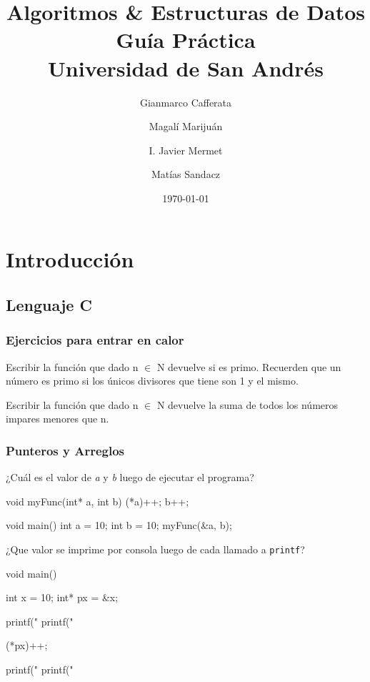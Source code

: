 \documentclass[titlepage,oneside]{book}
\title{
	Algoritmos \& Estructuras de Datos\\
	\large Guía Práctica \\
	\large Universidad de San Andrés
}
\author{Gianmarco Cafferata\\
	\and
	Magalí Marijuán\\
	\and
	I. Javier Mermet
	\and
	Matías Sandacz
}
\date{\today}
\begin{document}
\maketitle
\tableofcontents

\part{Introducción}
\chapter{Lenguaje C}

\section{Ejercicios para entrar en calor}
\begin{Exercise}
Escribir la función que dado n $\in$ N devuelve si es primo. Recuerden que un número es primo si los únicos divisores que tiene son 1 y el mismo.
\end{Exercise}

\begin{Exercise}
Escribir la función que dado n $\in$ N devuelve la suma de todos los números impares menores que n.
\end{Exercise}

\section{Punteros y Arreglos}

\begin{Exercise} ¿Cuál es el valor de \textit{a} y \textit{b} luego de ejecutar el programa?
	\newline
	\begin{ccode}
	    void myFunc(int* a, int b)
	    {
	    (*a)++;
	    b++;
	    }

	    void main()
	    {
	        int a = 10;
	        int b = 10;
	        myFunc(&a, b);
	    }
	\end{ccode}
\end{Exercise}

\begin{Exercise} ¿Que valor se imprime por consola luego de cada llamado a \texttt{printf}?
	\newline
    \begin{ccode}
        void main()
        {
           int x = 10;
           int* px = &x;

           printf("%
           printf("%

           (*px)++;

           printf("%
           printf("%
        }
    \end{ccode}
\end{Exercise}
\end{document}
